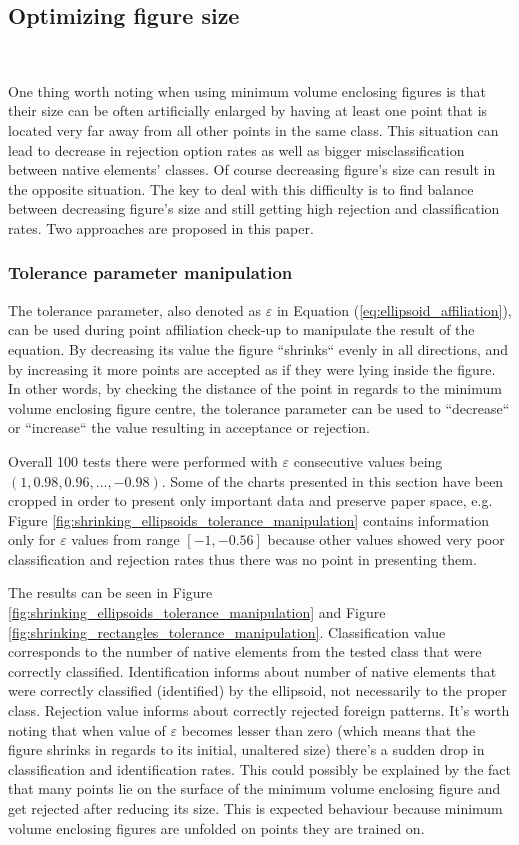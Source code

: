 \subsection{Optimizing figure size} \ \label{size_optimizing}

One thing worth noting when using minimum volume enclosing figures is that their size can be often artificially enlarged by having at least one point that is located very far away from all other points in the same class. This situation can lead to decrease in rejection option rates as well as bigger misclassification between native elements' classes. Of course decreasing figure's size can result in the opposite situation. The key to deal with this difficulty is to find balance between decreasing figure's size and still getting high rejection and classification rates. Two approaches are proposed in this paper.

\subsubsection{Tolerance parameter manipulation}

The tolerance parameter, also denoted as $\varepsilon$ in Equation (\ref{eq:ellipsoid_affiliation}), can be used during point affiliation check-up to manipulate the result of the equation. By decreasing its value the figure ``shrinks`` evenly in all directions, and by increasing it more points are accepted as if they were lying inside the figure. In other words, by checking the distance of the point in regards to the minimum volume enclosing figure centre, the tolerance parameter can be used to ``decrease`` or ``increase`` the value resulting in acceptance or rejection.

Overall 100 tests there were performed with $\varepsilon$ consecutive values being~$(1, 0.98, 0.96, \dots, -0.98)$. Some of the charts presented in this section have been cropped in order to present only important data and preserve paper space, e.g. Figure \ref{fig:shrinking_ellipsoids_tolerance_manipulation} contains information only for $\varepsilon$ values from range $[-1, -0.56]$ because other values showed very poor classification and rejection rates thus there was no point in presenting them.

The results can be seen in Figure \ref{fig:shrinking_ellipsoids_tolerance_manipulation} and Figure \ref{fig:shrinking_rectangles_tolerance_manipulation}. Classification value corresponds to the number of native elements from the tested class that were correctly classified. Identification informs about number of native elements that were correctly classified (identified) by the ellipsoid, not necessarily to the proper class. Rejection value informs about correctly rejected foreign patterns. It's worth noting that when value of $\varepsilon$ becomes lesser than zero (which means that the figure shrinks in regards to its initial, unaltered size) there's a sudden drop in classification and identification rates. This could possibly be explained by the fact that many points lie on the surface of the minimum volume enclosing figure and get rejected after reducing its size. This is expected behaviour because minimum volume enclosing figures are unfolded on points they are trained on.

